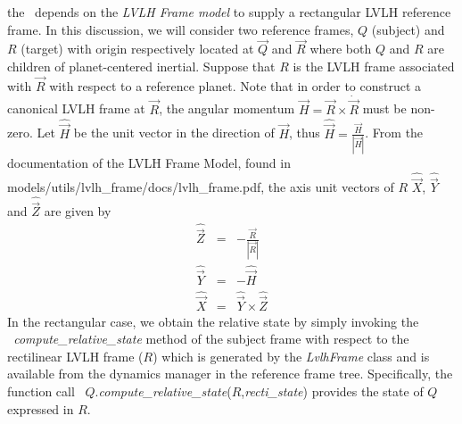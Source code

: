 %
%
% 
%

the \LRDSDesc\ depends on the \textit{LVLH Frame model} to supply a
rectangular LVLH reference frame.
In this discussion, we will consider two reference frames, $Q$ (subject) and
$R$ (target) with origin respectively located at $\vec Q$ and $\vec R$
where both $Q$ and $R$ are children of planet-centered inertial. Suppose
that $R$ is the LVLH frame associated with $\vec R$ with respect to a
reference planet.  Note that in order to construct a canonical LVLH frame at
$\vec R$, the angular momentum $\vec H = \vec R \times \dot{\vec{R}}$
must be non-zero. Let $\hat{\vec{H}}$ be the
unit vector in the direction of $\vec H$, thus $\hat{\vec{H}} =
\frac{\vec H}{|\vec H|}$. From the documentation of the LVLH Frame Model,
found in models/utils/lvlh\_frame/docs/lvlh\_frame.pdf, the axis unit vectors
of $R$ $\hat{\vec{X}}$, $\hat{\vec{Y}}$ and $\hat{\vec{Z}}$ are given by
\begin{eqnarray}
\hat{\vec{Z}} & = & -\frac{\vec R}{|\vec R|} \\ \nonumber
\hat{\vec{Y}} & = & -\hat{\vec{H}} \\ \nonumber
\hat{\vec{X}} & = & \hat{\vec{Y}} \times \hat{\vec{Z}}
\label{eq:lvlh_axes}
\end{eqnarray}
In the rectangular case, we obtain the relative state by simply invoking the
\textit{~compute\_relative\_state} method of the subject frame with respect to the
rectilinear LVLH frame ($R$) which is generated by the \textit{LvlhFrame} class and is
available from the dynamics manager in the reference frame tree. Specifically,
the function call
~$Q$.\textit{compute\_relative\_state}($R$,\textit{recti\_state}) provides
the state of $Q$ expressed in $R$.

